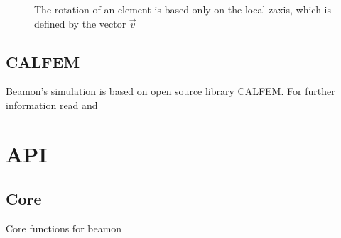 \documentclass[letterpaper,10pt,english]{sphinxmanual}
\begin{document}
\begin{figure}[htbp]
\centering
\capstart

\noindent{}
\caption{The rotation of an element is based only on the local z\sphinxhyphen{}axis, which is defined by the vector \(\vec{v}\)}\label{\detokenize{theory:id1}}\end{figure}


\subsection{CALFEM}
\label{\detokenize{theory:calfem}}
Beamon’s simulation is based on open source library CALFEM. For further information read
 and


\section{API}
\label{\detokenize{api:api}}\label{\detokenize{api::doc}}

\subsection{Core}
\label{\detokenize{api:module-beamon.core}}\label{\detokenize{api:core}}
Core functions for beamon
\end{document}
